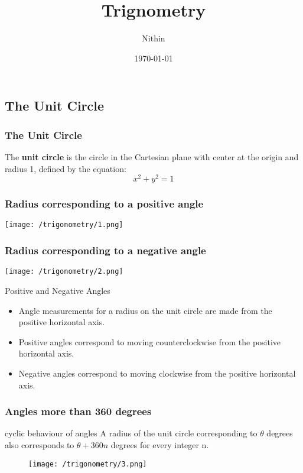 \documentclass{beamer}
\title{Trignometry}
\author{Nithin}
\institute{}
\date{\today}
\begin{document}
\begin{frame}
  \titlepage
\end{frame}
\begin{frame}
  \tableofcontents
\end{frame}


\subsection{The Unit Circle}
\begin{frame}
    \frametitle{The Unit Circle}
    \begin{definition}
        The \textbf{unit circle} is the circle in the Cartesian plane with center at the origin and radius 1, defined by the equation:
        \[
        x^2 + y^2 = 1
        \]
    \end{definition}                                                                                                                                    
\end{frame}

\begin{frame}
    \frametitle{Radius corresponding to a positive angle}
    \centering
    \texttt{[image: /trigonometry/1.png]}
\end{frame}

\begin{frame}
    \frametitle{Radius corresponding to a negative angle}
    \centering
    \texttt{[image: /trigonometry/2.png]}
\end{frame}

\begin{frame}
    \begin{block}{Positive and Negative Angles}
        \begin{itemize}
            \item Angle measurements for a radius on the unit circle are made from the positive horizontal axis.
            \item Positive angles correspond to moving counterclockwise from the positive horizontal axis.
            \item Negative angles correspond to moving clockwise from the positive horizontal axis.
        \end{itemize}
    \end{block}
\end{frame}

\begin{frame}
    \frametitle{Angles more than 360 degrees}
    \begin{block}{cyclic behaviour of angles}
        A radius of the unit circle corresponding to $\theta$ degrees also corresponds to $\theta + 360n$ degrees for every integer n.
    \end{block}
    \begin{figure}[h]    
        \centering
        \texttt{[image: /trigonometry/3.png]}
    \end{figure}
\end{frame}
\end{document}
